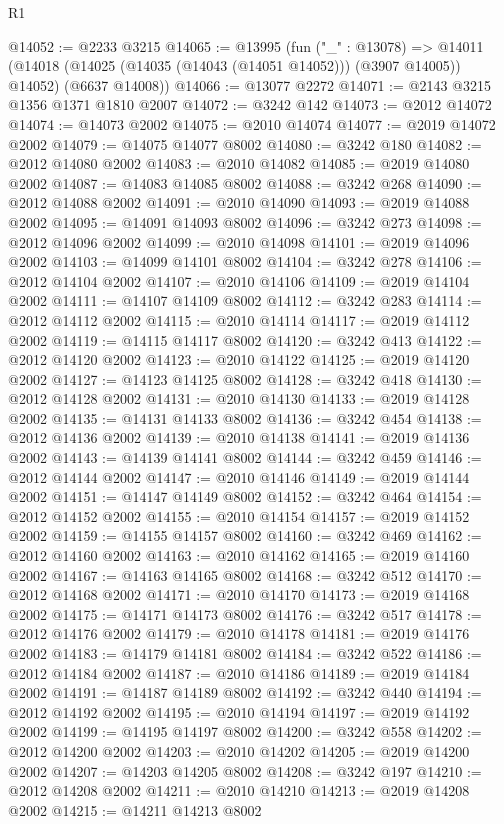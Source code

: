 \begin{lexlean}{R1}
\begin{coremodule}
@14052 := @2233 @3215
@14065 := @13995
    (fun ("_" : @13078) =>
    @14011 (@14018 (@14025 (@14035 (@14043 (@14051 @14052))) (@3907 @14005)) @14052) (@6637 @14008))
@14066 := @13077 @2272
@14071 := @2143 @3215 @1356 @1371 @1810 @2007
@14072 := @3242 @142
@14073 := @2012 @14072
@14074 := @14073 @2002
@14075 := @2010 @14074
@14077 := @2019 @14072 @2002
@14079 := @14075 @14077 @8002
@14080 := @3242 @180
@14082 := @2012 @14080 @2002
@14083 := @2010 @14082
@14085 := @2019 @14080 @2002
@14087 := @14083 @14085 @8002
@14088 := @3242 @268
@14090 := @2012 @14088 @2002
@14091 := @2010 @14090
@14093 := @2019 @14088 @2002
@14095 := @14091 @14093 @8002
@14096 := @3242 @273
@14098 := @2012 @14096 @2002
@14099 := @2010 @14098
@14101 := @2019 @14096 @2002
@14103 := @14099 @14101 @8002
@14104 := @3242 @278
@14106 := @2012 @14104 @2002
@14107 := @2010 @14106
@14109 := @2019 @14104 @2002
@14111 := @14107 @14109 @8002
@14112 := @3242 @283
@14114 := @2012 @14112 @2002
@14115 := @2010 @14114
@14117 := @2019 @14112 @2002
@14119 := @14115 @14117 @8002
@14120 := @3242 @413
@14122 := @2012 @14120 @2002
@14123 := @2010 @14122
@14125 := @2019 @14120 @2002
@14127 := @14123 @14125 @8002
@14128 := @3242 @418
@14130 := @2012 @14128 @2002
@14131 := @2010 @14130
@14133 := @2019 @14128 @2002
@14135 := @14131 @14133 @8002
@14136 := @3242 @454
@14138 := @2012 @14136 @2002
@14139 := @2010 @14138
@14141 := @2019 @14136 @2002
@14143 := @14139 @14141 @8002
@14144 := @3242 @459
@14146 := @2012 @14144 @2002
@14147 := @2010 @14146
@14149 := @2019 @14144 @2002
@14151 := @14147 @14149 @8002
@14152 := @3242 @464
@14154 := @2012 @14152 @2002
@14155 := @2010 @14154
@14157 := @2019 @14152 @2002
@14159 := @14155 @14157 @8002
@14160 := @3242 @469
@14162 := @2012 @14160 @2002
@14163 := @2010 @14162
@14165 := @2019 @14160 @2002
@14167 := @14163 @14165 @8002
@14168 := @3242 @512
@14170 := @2012 @14168 @2002
@14171 := @2010 @14170
@14173 := @2019 @14168 @2002
@14175 := @14171 @14173 @8002
@14176 := @3242 @517
@14178 := @2012 @14176 @2002
@14179 := @2010 @14178
@14181 := @2019 @14176 @2002
@14183 := @14179 @14181 @8002
@14184 := @3242 @522
@14186 := @2012 @14184 @2002
@14187 := @2010 @14186
@14189 := @2019 @14184 @2002
@14191 := @14187 @14189 @8002
@14192 := @3242 @440
@14194 := @2012 @14192 @2002
@14195 := @2010 @14194
@14197 := @2019 @14192 @2002
@14199 := @14195 @14197 @8002
@14200 := @3242 @558
@14202 := @2012 @14200 @2002
@14203 := @2010 @14202
@14205 := @2019 @14200 @2002
@14207 := @14203 @14205 @8002
@14208 := @3242 @197
@14210 := @2012 @14208 @2002
@14211 := @2010 @14210
@14213 := @2019 @14208 @2002
@14215 := @14211 @14213 @8002

\end{coremodule}
\end{lexlean}
